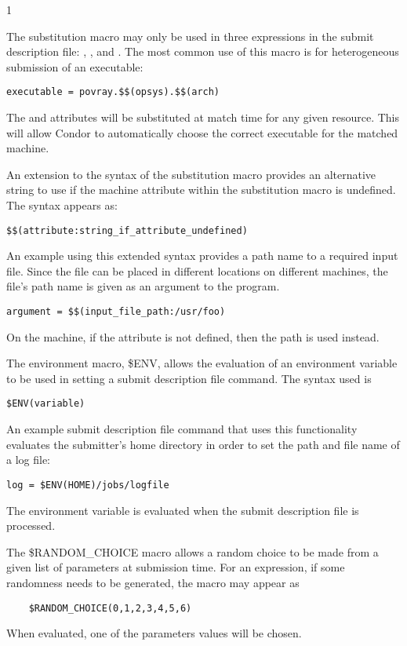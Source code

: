 \begin{ManPage}{\label{man-condor-submit}}{1}
\begin{description}
The substitution macro may only be used in three expressions in the
submit description file: , , and
. The most common use of this macro is for heterogeneous
submission of an executable:
\begin{verbatim}
executable = povray.$$(opsys).$$(arch)
\end{verbatim}
The  and  attributes will be substituted at
match time for any given resource. This will allow Condor to automatically
choose the correct executable for the matched machine.

An extension to the syntax of the substitution macro provides an
alternative string to use if the machine attribute within the
substitution macro is undefined.
The syntax appears as:
\begin{verbatim} 
$$(attribute:string_if_attribute_undefined)
\end{verbatim}

An example using this extended syntax provides a path name to a
required input file.
Since the file can be placed in different locations on
different machines, the file's path name is given as an argument
to the program.
\begin{verbatim} 
argument = $$(input_file_path:/usr/foo)
\end{verbatim}
On the machine, if the attribute  is not
defined, then the path  is used instead.

The environment macro, \$ENV, allows the evaluation of an environment
variable to be used in setting a submit description file command.
The syntax used is
\begin{verbatim} 
$ENV(variable)
\end{verbatim}
An example submit description file command that uses this functionality
evaluates the submitter's home directory in order to set the
path and file name of a log file:
\begin{verbatim} 
log = $ENV(HOME)/jobs/logfile
\end{verbatim}
The environment variable is evaluated when the submit description
file is processed.

The \$RANDOM\_CHOICE macro allows a random choice to be made
from a given list of parameters at submission time.
For an expression, if some randomness needs to be generated,
the macro may appear as
\begin{verbatim} 
    $RANDOM_CHOICE(0,1,2,3,4,5,6)
\end{verbatim}
When evaluated, one of the parameters values will be chosen. 


\end{description}
\end{ManPage}
